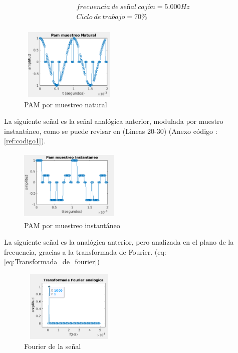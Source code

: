 \begin{equation} \label{eq:frecuencia_de_señal_cajo_y_ciclo_de_trabajo}
\begin{split} 
&frecuencia\ de\ señal\ cajón = 5.000 Hz \\
&Ciclo\ de\ trabajo = 70\% \\
\end{split} 
\end{equation} 

\begin{figure}[H]
    \centering
    \includegraphics[height=130px, width=180px]{Imagenes/Actividad1/PAMnatural.png}
    \caption{PAM por muestreo natural}
    \label{fig:PAM_por_muestreo_natural}
\end{figure}

La siguiente señal es la señal analógica anterior, modulada por muestro instantáneo, como se puede revisar en (Lineas 20-30) (Anexo código :\ref{ref:codigo1}).

\begin{figure}[H]
    \centering
    \includegraphics[height=130px, width=180px]{Imagenes/Actividad1/PAMplana.png}
    \caption{PAM por muestreo instantáneo}
    \label{fig:PAM_por_muestreo_instantaneo}
\end{figure}

La siguiente señal es la analógica anterior, pero analizada en el plano de la frecuencia, gracias a la transformada de Fourier. (eq:\ref{eq:Transformada_de_fourier})

\begin{figure}[H]
    \centering
    \includegraphics[height=130px, width=180px]{Imagenes/Actividad1/tf.png}
    \caption{Fourier de la señal}
    \label{fig:Fourier_de_la_senal}
\end{figure}

